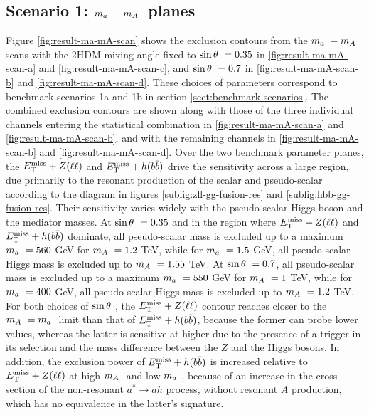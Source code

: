 \subsection{Scenario 1: \texorpdfstring{$m_a~-m_A~$}{TEXT} planes}
Figure \ref{fig:result-ma-mA-scan} shows the exclusion contours from the $m_a~-m_A~$ scans with the 2HDM mixing angle fixed to $\sin\theta~=0.35$ in \ref{fig:result-ma-mA-scan-a} and \ref{fig:result-ma-mA-scan-c}, and $\sin\theta~=0.7$ in \ref{fig:result-ma-mA-scan-b} and \ref{fig:result-ma-mA-scan-d}. These choices of parameters correspond to benchmark scenarios 1a and 1b in section \ref{sect:benchmark-scenarios}. The combined exclusion contours are shown along with those of the three individual channels entering the statistical combination in \ref{fig:result-ma-mA-scan-a} and \ref{fig:result-ma-mA-scan-b}, and with the remaining channels in \ref{fig:result-ma-mA-scan-b} and \ref{fig:result-ma-mA-scan-d}. Over the two benchmark parameter planes, the $E_{\mathrm{T}}^{\mathrm{miss}}+Z(\ell\ell)$ and $E_{\mathrm{T}}^{\mathrm{miss}}+h(b\bar{b})$ drive the sensitivity across a large region, due primarily to the resonant production of the scalar and pseudo-scalar according to the diagram in figures \ref{subfig:zll-gg-fusion-res} and \ref{subfig:hbb-gg-fusion-res}. Their sensitivity varies widely with the pseudo-scalar Higgs boson and the mediator masses. At $\sin\theta~=0.35$ and in the region where $E_{\mathrm{T}}^{\mathrm{miss}}+Z(\ell\ell)$ and $E_{\mathrm{T}}^{\mathrm{miss}}+h(b\bar{b})$ dominate, all pseudo-scalar mass is excluded up to a maximum $m_a~=560$ GeV for $m_A~=1.2$ TeV, while for $m_a~=1.5$ GeV, all pseudo-scalar Higgs mass is excluded up to $m_A~=1.55$ TeV. At $\sin\theta~=0.7$, all pseudo-scalar mass is excluded up to a maximum $m_a~=550$ GeV for $m_A~=1$ TeV, while for $m_a~=400$ GeV, all pseudo-scalar Higgs mass is excluded up to $m_A~=1.2$ TeV. For both choices of $\sin\theta~$, the $E_{\mathrm{T}}^{\mathrm{miss}}+Z(\ell\ell)$ contour reaches closer to the $m_A~=m_a~$ limit than that of $E_{\mathrm{T}}^{\mathrm{miss}}+h(b\bar{b})$, because the former can probe lower \met values, whereas the latter is sensitive at higher \met due to the presence of a \met trigger in its selection and the mass difference between the $Z$ and the Higgs bosons. In addition, the exclusion power of $E_{\mathrm{T}}^{\mathrm{miss}}+h(b\bar{b})$ is increased relative to $E_{\mathrm{T}}^{\mathrm{miss}}+Z(\ell\ell)$ at high $m_A~$ and low $m_a~$, because of an increase in the cross-section of the non-resonant $a^*\rightarrow ah$ process, without resonant $A$ production, which has no equivalence in the latter's signature.

